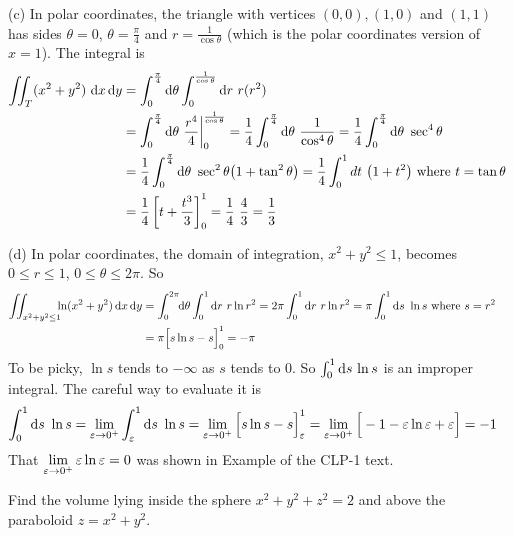 \begin{solution}
(c) In polar coordinates, the triangle
with vertices $(0,0), (1,0)$ and $(1,1)$ has sides $\theta=0$, 
$\theta=\frac{\pi}{4}$ and $r=\frac{1}{\cos\theta}$ (which is the polar 
coordinates version of $x=1$). The integral is 
\begin{align*}
\dblInt_T (x^2+y^2)\ \dee{x}\,\dee{y}
&=\int_0^{{\pi\over 4}}\dee{\theta}\int_0^{1\over\cos\theta} 
                                                  \dee{r}\ r(r^2)\\
&=\int_0^{{\pi\over 4}}\dee{\theta}\ 
\frac{r^4}{4}\bigg|_0^{1\over\cos\theta}  
=\frac{1}{4}\int_0^{{\pi\over 4}}\dee{\theta}\ \frac{1}{\cos^4\theta}
=\frac{1}{4}\int_0^{{\pi\over 4}}\dee{\theta}\ \sec^4\theta\cr
&=\frac{1}{4}\int_0^{{\pi\over 4}}\dee{\theta}\ \sec^2\theta\big(1+\tan^2\theta\big)
=\frac{1}{4}\int_0^1d t\ \big(1+t^2\big)\text{ where $t=\tan\theta$ }\cr
&=\frac{1}{4}\left[t+\frac{t^3}{3}\right]_0^1
=\frac{1}{4}\ \frac{4}{3}
=\frac{1}{3}
\end{align*}

(d) In polar coordinates, the domain of integration,
$x^2+y^2\le 1$, becomes $0\le r\le 1$, $0\le\theta\le 2\pi$. So
\begin{align*}
\iint_{x^2+y^2\le 1}\hskip-5pt \ln(x^2+y^2)\,\mathrm{d}x\,\mathrm{d}y
&=\int_0^{2\pi}\hskip-3pt \mathrm{d}\theta\int_0^1\mathrm{d}r\ r\ln r^2
=2\pi\int_0^1\mathrm{d}r\ r\ln r^2
=\pi\int_0^1 \mathrm{d}s\ \ln s\text{ where $s=r^2$ }\cr
&=\pi\Big[s\ln s-s\Big]_0^1
=-\pi
\end{align*}
To be picky, $\ln s$ tends to $-\infty$ as $s$ tends to $0$.
So $\int_0^1\mathrm{d}s\,\ln s$ is an improper integral. The careful way to
evaluate it is
\begin{align*}
\int_0^1 \mathrm{d}s\ \ln s
&=\lim_{\varepsilon\to 0^+}\int_\varepsilon^1 \mathrm{d}s\ \ln s
=\lim_{\varepsilon\to 0^+}\Big[s\ln s-s\Big]_\varepsilon^1
=\lim_{\varepsilon\to 0^+}\Big[-1-\varepsilon\ln\varepsilon+\varepsilon\Big]
=-1
\end{align*}
That $\lim\limits_{\varepsilon\to 0^+}\varepsilon\ln\varepsilon = 0$ was shown in 
Example \eref{CLP100}{eg:hopitalJ} of the CLP-1 text.


\end{solution}

\begin{question}
Find the volume lying inside the sphere $x^2+y^2+z^2=2$ 
and above the paraboloid $z=x^2+y^2$.
\end{question}

%

